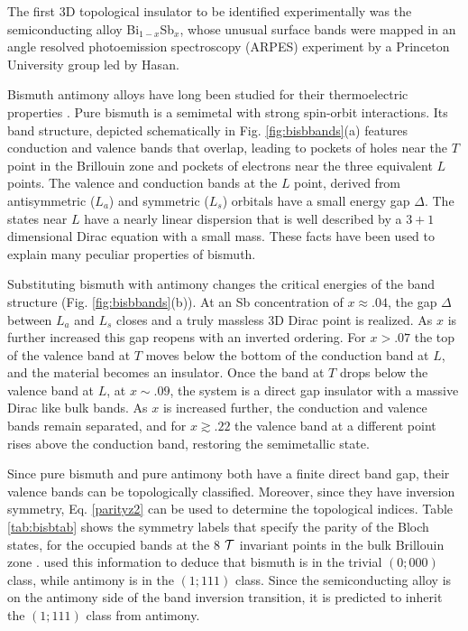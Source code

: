 \documentclass[twocolumn,floatfix,showpacs,rmp,aps]{revtex4}
\begin{document}
The first 3D topological insulator to be identified experimentally
was the semiconducting alloy
Bi$_{1-x}$Sb$_{x}$, whose unusual surface bands were mapped in an
angle resolved photoemission spectroscopy (ARPES) experiment by a Princeton
University group led by Hasan\cite{hsieh08}.

Bismuth antimony alloys have long been studied for their
thermoelectric properties \cite{lenoir96}.  Pure bismuth is a semimetal with
strong spin-orbit interactions.  Its band structure, depicted schematically in
Fig. \ref{fig:bisbbands}(a) features conduction and valence bands that overlap,
leading to pockets of holes near the $T$ point in the Brillouin zone
and pockets of electrons near the three equivalent $L$ points.
The valence and conduction bands at the $L$ point, derived
from antisymmetric ($L_a$) and symmetric ($L_s$) orbitals have a small
energy gap $\Delta$.  The states near $L$ have a nearly linear
dispersion that is well described by a $3+1$
dimensional Dirac equation \cite{wolff64} with a small mass.  These facts have been used to
explain many peculiar properties of bismuth.

Substituting bismuth with antimony changes the critical energies of
the band structure (Fig. \ref{fig:bisbbands}(b)). At an Sb concentration of $x
\approx .04$, the gap $\Delta$ between $L_a$ and $L_s$ closes and a
truly massless 3D Dirac point is realized. As $x$ is
further increased this gap reopens with an inverted ordering.
For $x >.07$ the top of the valence band at $T$ moves below the bottom of the conduction
band at $L$, and the material becomes an
insulator. Once the band at $T$ drops below the valence band at $L$, at
$x\sim .09$, the system is a direct gap insulator with
a massive Dirac like bulk bands.  As $x$ is increased further, the conduction
and valence bands remain separated, and for $x \gtrsim .22$ the valence band at
a different point rises above the conduction band, restoring the semimetallic
state.

Since pure bismuth and pure antimony both have a finite direct band gap, their
valence bands can be topologically classified.  Moreover, since they have
inversion symmetry, Eq. \ref{parityz2} can be used to determine the topological indices.
Table \ref{tab:bisbtab} shows the symmetry labels that specify the parity
of the Bloch states, for the occupied bands at the 8
${\cal T}$ invariant points in the bulk Brillouin zone \cite{liuallen95}.
\textcite{fukane07} used this information to deduce
that bismuth is in the trivial $(0;000)$ class, while antimony is in the
$(1;111)$ class.  Since the semiconducting alloy is on the antimony side of the
band inversion transition, it is predicted to inherit the $(1;111)$ class from
antimony.
\end{document}
